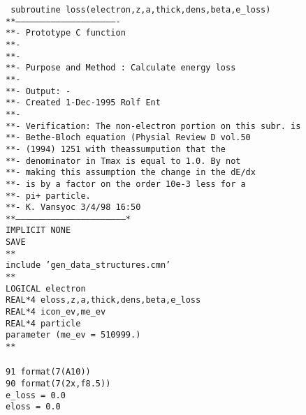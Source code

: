 {\tt
      subroutine loss(electron,z,a,thick,dens,beta,e\_loss)\\
**-------------------------------------------------------------\\
**-         Prototype C function \\
**- \\
**-\\
**-    Purpose and Method :  Calculate energy loss \\
**-    \\
**-    Output: -\\
**-    Created   1-Dec-1995  Rolf Ent\\
**-   \\
**-    Verification:  The non-electron portion on this subr. is \\
**-		     Bethe-Bloch equation (Physial Review D vol.50 \\
**-		     (1994) 1251 with theassumpution that the \\
**-		     denominator in Tmax is equal to 1.0. By not\\
**-	  	     making this assumption the change in the dE/dx \\
**-		     is by a factor on the order 10e-3 less for a \\
**-		     pi+ particle.\\
**-                   K. Vansyoc 3/4/98 16:50\\
**-----------------------------------------------------------------*\\
      IMPLICIT NONE\\
      SAVE\\
**\\
      include 'gen\_data\_structures.cmn'\\
**\\
      LOGICAL electron\\
      REAL*4 eloss,z,a,thick,dens,beta,e\_loss\\
      REAL*4 icon\_ev,me\_ev\\
      REAL*4 particle\\
      parameter (me\_ev = 510999.)\\
**\\
 \\
 91   format(7(A10))\\
 90   format(7(2x,f8.5))\\
      e\_loss = 0.0\\
      eloss  = 0.0\\
 \\
}
